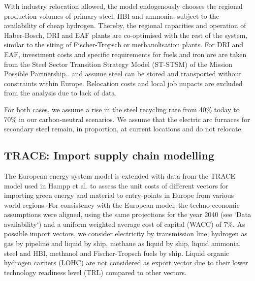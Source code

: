 With industry relocation allowed, the model endogenously chooses the regional
production volumes of primary steel, HBI and ammonia, subject to the
availability of cheap hydrogen. Thereby, the regional capacities and operation
of Haber-Bosch, DRI and EAF plants are co-optimised with the rest of the system,
similar to the siting of Fischer-Tropsch or methanolisation plants. For DRI and
EAF, investment costs and specific requirements for fuels and iron ore are taken
from the Steel Sector Transition Strategy Model (ST-STSM) of the Mission
Possible
Partnership.\cite{missionpossiblepartnershipSteelSectorTransition2022,missionpossiblepartnershipMakingNetZeroSteel2022}.
and assume steel can be stored and transported without constraints within
Europe. Relocation costs and local job impacts are excluded from the analysis
due to lack of data.

For both cases, we assume a rise in the steel recycling rate from 40\% today to
70\% in our carbon-neutral
scenarios.\cite{materialeconomicsIndustrialTransformation2019} We assume that
the electric arc furnaces for secondary steel remain, in proportion, at current
locations and do not relocate.

\subsection*{TRACE: Import supply chain modelling}

The European energy system model is extended with data from the TRACE model used
in Hampp et al.\cite{hamppImportOptions2023} to assess the unit costs of
different vectors for importing green energy and material to entry-points in
Europe from various world regions. For consistency with the European model, the
techno-economic assumptions were aligned, using the same projections for the
year 2040 (see `Data availability`) and a uniform weighted average cost of
capital (WACC) of 7\%.\cite{lonerganImprovingRepresentationCost2023} As possible
import vectors, we consider electricity by transmission line, hydrogen as gas by
pipeline and liquid by ship, methane as liquid by ship, liquid ammonia, steel
and HBI, methanol and Fischer-Tropsch fuels by ship. Liquid organic hydrogen
carriers (LOHC) are not considered as export vector due to their lower
technology readiness level (TRL) compared to other
vectors.\cite{irenaGlobalHydrogen2022}

